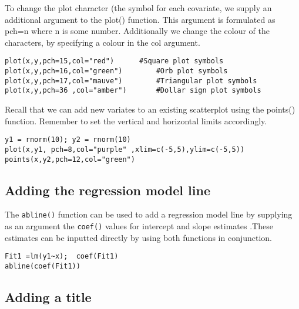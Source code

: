 To change the plot character (the symbol for each covariate, we supply an additional argument to the plot() function.  This argument is formulated as pch=n where n is some number.
Additionally we change the colour of the characters, by specifying a colour in the col argument.
\footnotesize \begin{verbatim}
plot(x,y,pch=15,col="red")		#Square plot symbols
plot(x,y,pch=16,col="green")		#Orb plot symbols
plot(x,y,pch=17,col="mauve")		#Triangular plot symbols
plot(x,y,pch=36	,col="amber")		#Dollar sign plot symbols
\end{verbatim}\normalsize
Recall that we can add new variates to an existing scatterplot using the points() function. Remember to set the vertical and horizontal limits accordingly.
\footnotesize \begin{verbatim}
y1 = rnorm(10); y2 = rnorm(10)
plot(x,y1, pch=8,col="purple" ,xlim=c(-5,5),ylim=c(-5,5))
points(x,y2,pch=12,col="green")
\end{verbatim}\normalsize
\subsection{Adding the regression model line}

The \texttt{abline()} function can be used to add a regression model line  by supplying as an argument the \texttt{coef()} values for intercept and slope estimates .These estimates can be inputted directly by using both functions in conjunction.

\footnotesize \begin{verbatim}
Fit1 =lm(y1~x);  coef(Fit1)
abline(coef(Fit1))	
\end{verbatim}\normalsize

\subsection{Adding a title }

